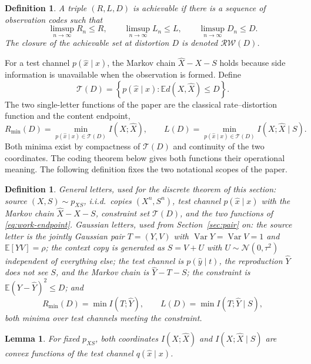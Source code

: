 \documentclass[11pt,onecolumn]{IEEEtran}
\newtheorem{lemma}[theorem]{Lemma}
\newtheorem{definition}[theorem]{Definition}
\newcommand{\E}{\mathbb{E}}
\newcommand{\hX}{\widehat{X}}
\newcommand{\hY}{\widehat{Y}}
\newcommand{\RW}{\mathcal{R}\!\mathcal{W}}
\begin{document}
\begin{definition}\label{def:achievability}
A triple $(R,L,D)$ is achievable if there is a sequence of observation codes
such that
\begin{equation}
 \limsup_{n\to\infty}R_n\le R,\qquad
 \limsup_{n\to\infty}L_n\le L,\qquad
 \limsup_{n\to\infty}D_n\le D.
\end{equation}
The closure of the achievable set at distortion $D$ is denoted $\RW(D)$.
\end{definition}

For a test channel $p(\hat x\mid x)$, the Markov chain $\hX-X-S$ holds
because side information is unavailable when the observation is formed.
Define
\begin{equation}
 \mathcal T(D)
 =\left\{p(\hat x\mid x):\E d(X,\hX)\le D\right\}.
\end{equation}
The two single-letter functions of the paper are the classical
rate--distortion function and the content endpoint,
\begin{equation}
 R_{\min}(D)=\min_{p(\hat x\mid x)\in\mathcal T(D)}I(X;\hX),
 \qquad
 L(D)=\min_{p(\hat x\mid x)\in\mathcal T(D)}I(X;\hX\mid S).
 \label{eq:work-endpoint}
\end{equation}
Both minima exist by compactness of $\mathcal T(D)$ and continuity of the
two coordinates. The coding theorem below gives both functions their
operational meaning. The following definition fixes the two notational
scopes of the paper.

\begin{definition}\label{def:problem}
\emph{General letters}, used for the discrete theorem of this section:
source $(X,S)\sim p_{XS}$, i.i.d.\ copies $(X^n,S^n)$, test channel
$p(\hat x\mid x)$ with the Markov chain $\hX-X-S$, constraint set
$\mathcal T(D)$, and the two functions of \eqref{eq:work-endpoint}.
\emph{Gaussian letters}, used from Section~\ref{sec:pair} on: the source
letter is the jointly Gaussian pair $T=(Y,V)$ with
$\operatorname{Var}Y=\operatorname{Var}V=1$ and $\E[YV]=\rho$; the context
copy is generated as $S=V+U$ with $U\sim\mathcal N(0,\tau^2)$ independent
of everything else; the test channel is $p(\hat y\mid t)$, the reproduction
$\hY$ does not see $S$, and the Markov chain is $\hY-T-S$; the constraint
is $\E(Y-\hY)^2\le D$; and
\[
R_{\min}(D)=\min I(T;\hY),
\qquad
L(D)=\min I(T;\hY\mid S),
\]
both minima over test channels meeting the constraint.
\end{definition}

\begin{lemma}\label{lem:convexity}
For fixed $p_{XS}$, both coordinates $I(X;\hX)$ and $I(X;\hX\mid S)$ are
convex functions of the test channel $q(\hat x\mid x)$.
\end{lemma}
\end{document}

